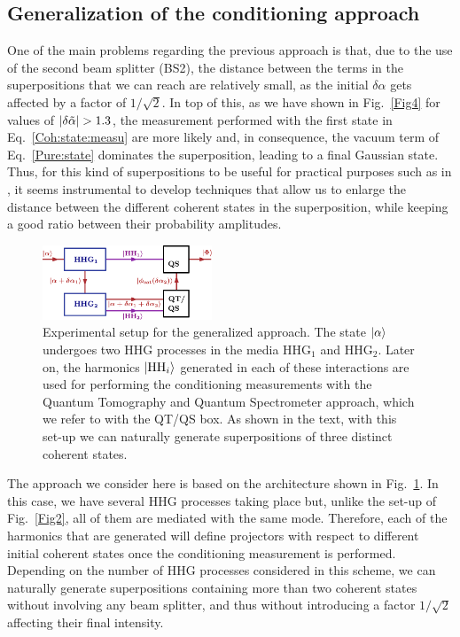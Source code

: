 \subsection{Generalization of the conditioning approach}
One of the main problems regarding the previous approach is that, due to the use of the second beam splitter (BS2), the distance between the terms in the superpositions that we can reach are relatively small, as the initial $\delta \alpha$ gets affected by a factor of $1/\sqrt{2}$. In top of this, as we have shown in Fig.~\ref{Fig4} for values of $|\delta \Tilde{\alpha}| > 1.3$, the measurement performed with the first state in Eq.~\eqref{Coh:state:measu} are more likely and, in consequence, the vacuum term of Eq.~\eqref{Pure:state} dominates the superposition, leading to a final Gaussian state. Thus, for this kind of superpositions to be useful for practical purposes such as in \cite{Wenger2003}, it seems instrumental to develop techniques that allow us to enlarge the distance between the different coherent states in the superposition, while keeping a good ratio between their probability amplitudes.

\begin{figure}[h]
    \centering
    \includegraphics[width = 0.45\textwidth]{Fig5.pdf}
    \caption{Experimental setup for the generalized approach. The state $\ket{\alpha}$ undergoes two HHG processes in the media HHG$_1$ and HHG$_2$. Later on, the harmonics $\ket{\text{HH}_i}$ generated in each of these interactions are used for performing the conditioning measurements with the Quantum Tomography and Quantum Spectrometer approach, which we refer to with the QT/QS box. As shown in the text, with this set-up we can naturally generate superpositions of three distinct coherent states.}
    \label{Fig5}
\end{figure}


The approach we consider here is based on the architecture shown in Fig.~\ref{Fig5}. In this case, we have several HHG processes taking place but, unlike the set-up of Fig.~\ref{Fig2}, all of them are mediated with the same mode. Therefore, each of the harmonics that are generated will define projectors with respect to different initial coherent states once the conditioning measurement is performed. Depending on the number of HHG processes considered in this scheme, we can naturally generate superpositions containing more than two coherent states without involving any beam splitter, and thus without introducing a factor $1/\sqrt{2}$ affecting their final intensity.

